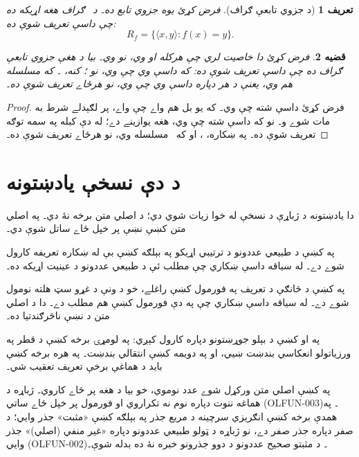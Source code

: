 \documentclass[12pt,a4paper,oneside]{report}
\newcommand{\Setabs}[2]{\{#1 : #2\}}
\newcommand{\tuple}[1]{\langle #1\rangle}
\newcommand{\pto}{\mathrel{\ooalign{\hfil$\mapstochar\mkern 5mu$\hfil\cr$\to$}}}
\newcommand{\fundefined}{\uparrow}
\newtheorem{defn}{تعريف}[section]
\newtheorem{prop}[defn]{قضيه}
\begin{document}
\begin{defn}[د جزوي تابعې ګراف]
فرض کړئ \LR{$f\colon A \pto B$} يوه جزوي تابع ده۔ د~ \emph{ګراف}
هغه اړيکه  ده چې داسې تعريف شوې ده:
\[
R_f = \Setabs{\tuple{x,y}}{f(x) = y}.
\]
\end{defn}

\begin{prop}
فرض کړئ  دا خاصيت لري چې هرکله 
او  وي، نو  وي۔ بيا  د هغې جزوي تابعې
\LR{$f\colon A \pto B$} ګراف ده چې داسې تعريف شوې ده: که داسې 
وي چې  وي، نو ؛ کنه، \LR{$f(x) \fundefined$}۔ که 
\emph{مسلسله} هم وي، يعنې د هر  دپاره داسې 
وي چې  وي، نو  هرځاے تعريف شوې ده۔
\end{prop}

\begin{proof}
فرض کړئ داسې  شته چې  وي۔ که يو بل  هم واے
چې  واے، پر  لګېدلے شرط به مات شوے و۔ نو که داسې 
شته چې  وي، هغه  يوازينے دے؛ له دې کبله  په سمه
توګه تعريف شوې ده۔ په ښکاره، ، او که~ مسلسله وي،
نو  هرځاے تعريف شوې ده۔
\end{proof}



\chapter*{د دې نسخې يادښتونه}
دا يادښتونه د ژباړې د نسخې له خوا زيات شوي دي؛ د اصلي متن برخه نۀ
دي۔ په اصلي متن کښې نښې پر خپل ځاے ساتل شوې دي۔

په  کښې د طبيعي عددونو د ترتيبي اړيکو په
بېلګه کښې  بې له ښکاره تعريفه کارول شوے دے۔ له سياقه داسې
ښکاري چې مطلب ئې د طبيعي عددونو د عينيت اړيکه ده۔

په  کښې د څانګې د تعريف په فورمول کښې
 راغلے، خو د ونې د غړو سټ هلته  نومول شوے دے۔ له سياقه
داسې ښکاري چې په دې فورمول کښې هم مطلب  دے۔ دا د اصلي متن د
نښې ناڅرګندتيا ده۔

په  او  کښې
 د بېلو جوړښتونو دپاره کارول کېږي: په لومړۍ برخه کښې د قطر
په ورزياتولو انعکاسي بندښت ښيي، او په دويمه کښې انتقالي بندښت۔
په هره برخه کښې بايد د هماغې برخې تعريف تعقيب شي۔

په  کښې اصلي متن ورکړل شوے
عدد  نوموي، خو بيا د هغه پر ځاے  کاروي۔ ژباړه د هماغه
ننوت دپاره نوم نه تکراروي او فورمول پر خپل ځاے ساتي
(OLFUN-003)۔ په همدې برخه کښې انګرېزي سرچينه د مربع جذر په
بېلګه کښې «مثبت» جذر وايي؛ د صفر دپاره جذر صفر دے، نو ژباړه
د ټولو طبيعي عددونو دپاره «غير منفي (اصلي)» جذر وايي
(OLFUN-002)۔ د مثبتو صحيح عددونو د دوو جذرونو خبره نۀ ده بدله شوې۔
\end{document}
